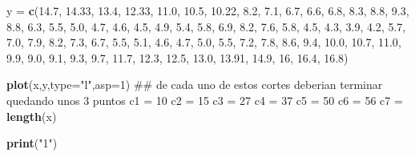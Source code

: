 \documentclass[]{article}
\newenvironment{Shaded}{\begin{snugshade}}{\end{snugshade}}
\newcommand{\KeywordTok}[1]{\textcolor[rgb]{0.13,0.29,0.53}{\textbf{#1}}}
\newcommand{\DataTypeTok}[1]{\textcolor[rgb]{0.13,0.29,0.53}{#1}}
\newcommand{\DecValTok}[1]{\textcolor[rgb]{0.00,0.00,0.81}{#1}}
\newcommand{\FloatTok}[1]{\textcolor[rgb]{0.00,0.00,0.81}{#1}}
\newcommand{\StringTok}[1]{\textcolor[rgb]{0.31,0.60,0.02}{#1}}
\newcommand{\NormalTok}[1]{#1}
\begin{document}
\begin{Shaded}
\begin{Highlighting}[]
\NormalTok{y =}\StringTok{ }\KeywordTok{c}\NormalTok{(}\FloatTok{14.7}\NormalTok{, }\FloatTok{14.33}\NormalTok{, }\FloatTok{13.4}\NormalTok{, }\FloatTok{12.33}\NormalTok{, }\FloatTok{11.0}\NormalTok{, }\FloatTok{10.5}\NormalTok{, }\FloatTok{10.22}\NormalTok{, }\FloatTok{8.2}\NormalTok{, }\FloatTok{7.1}\NormalTok{, }\FloatTok{6.7}\NormalTok{, }\FloatTok{6.6}\NormalTok{, }
  \FloatTok{6.8}\NormalTok{, }\FloatTok{8.3}\NormalTok{, }\FloatTok{8.8}\NormalTok{, }\FloatTok{9.3}\NormalTok{, }\FloatTok{8.8}\NormalTok{, }
  \FloatTok{6.3}\NormalTok{, }\FloatTok{5.5}\NormalTok{, }\FloatTok{5.0}\NormalTok{, }\FloatTok{4.7}\NormalTok{, }\FloatTok{4.6}\NormalTok{, }\FloatTok{4.5}\NormalTok{, }\FloatTok{4.9}\NormalTok{, }\FloatTok{5.4}\NormalTok{, }\FloatTok{5.8}\NormalTok{, }\FloatTok{6.9}\NormalTok{, }\FloatTok{8.2}\NormalTok{, }\FloatTok{7.6}\NormalTok{, }
  \FloatTok{5.8}\NormalTok{, }\FloatTok{4.5}\NormalTok{, }\FloatTok{4.3}\NormalTok{, }\FloatTok{3.9}\NormalTok{, }\FloatTok{4.2}\NormalTok{, }\FloatTok{5.7}\NormalTok{, }\FloatTok{7.0}\NormalTok{, }\FloatTok{7.9}\NormalTok{, }\FloatTok{8.2}\NormalTok{, }\FloatTok{7.3}\NormalTok{, }
  \FloatTok{6.7}\NormalTok{, }\FloatTok{5.5}\NormalTok{, }\FloatTok{5.1}\NormalTok{, }\FloatTok{4.6}\NormalTok{, }\FloatTok{4.7}\NormalTok{, }\FloatTok{5.0}\NormalTok{, }\FloatTok{5.5}\NormalTok{, }\FloatTok{7.2}\NormalTok{, }\FloatTok{7.8}\NormalTok{, }\FloatTok{8.6}\NormalTok{, }\FloatTok{9.4}\NormalTok{, }\FloatTok{10.0}\NormalTok{,  }\FloatTok{10.7}\NormalTok{, }\FloatTok{11.0}\NormalTok{, }
  \FloatTok{9.9}\NormalTok{, }\FloatTok{9.0}\NormalTok{, }\FloatTok{9.1}\NormalTok{, }\FloatTok{9.3}\NormalTok{, }\FloatTok{9.7}\NormalTok{, }\FloatTok{11.7}\NormalTok{, }
  \FloatTok{12.3}\NormalTok{, }\FloatTok{12.5}\NormalTok{, }\FloatTok{13.0}\NormalTok{, }\FloatTok{13.91}\NormalTok{, }\FloatTok{14.9}\NormalTok{, }\DecValTok{16}\NormalTok{, }\FloatTok{16.4}\NormalTok{, }\FloatTok{16.8}\NormalTok{)}

\KeywordTok{plot}\NormalTok{(x,y,}\DataTypeTok{type=}\StringTok{"l"}\NormalTok{,}\DataTypeTok{asp=}\DecValTok{1}\NormalTok{)}
\NormalTok{## de cada uno de estos cortes deberian terminar quedando unos 3 puntos }
\NormalTok{c1 =}\StringTok{ }\DecValTok{10}
\NormalTok{c2 =}\StringTok{ }\DecValTok{15}
\NormalTok{c3 =}\StringTok{ }\DecValTok{27}
\NormalTok{c4 =}\StringTok{ }\DecValTok{37}
\NormalTok{c5 =}\StringTok{ }\DecValTok{50}
\NormalTok{c6 =}\StringTok{ }\DecValTok{56}
\NormalTok{c7 =}\StringTok{ }\KeywordTok{length}\NormalTok{(x)}

\KeywordTok{print}\NormalTok{(}\StringTok{"1"}\NormalTok{)}
\end{Highlighting}
\end{Shaded}
\end{document}
